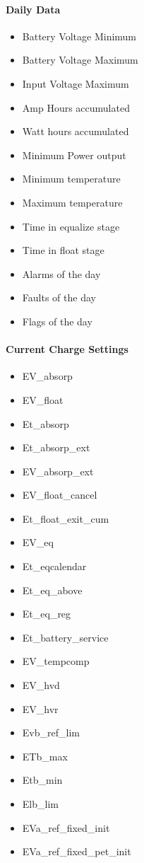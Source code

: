 \paragraph{Daily Data}
\begin{itemize}
	\item Battery Voltage Minimum
	\item Battery Voltage Maximum
	\item Input Voltage Maximum
	\item Amp Hours accumulated
	\item Watt hours accumulated
	\item Minimum Power output
	\item Minimum temperature
	\item Maximum temperature
	\item Time in equalize stage
	\item Time in float stage
	\item Alarms of the day
	\item Faults of the day
	\item Flags of the day
\end{itemize}
\par

\paragraph{Current Charge Settings}
\begin{itemize}
	\item EV\_absorp
	\item EV\_float
	\item Et\_absorp
	\item Et\_absorp\_ext
	\item EV\_absorp\_ext
	\item EV\_float\_cancel
	\item Et\_float\_exit\_cum
	\item EV\_eq
	\item Et\_eqcalendar
	\item Et\_eq\_above
	\item Et\_eq\_reg
	\item Et\_battery\_service
	\item EV\_tempcomp
	\item EV\_hvd
	\item EV\_hvr
	\item Evb\_ref\_lim
	\item ETb\_max
	\item Etb\_min
	\item Elb\_lim
	\item EVa\_ref\_fixed\_init
	\item EVa\_ref\_fixed\_pet\_init
\end{itemize}
\par


